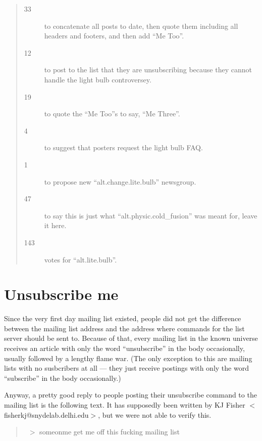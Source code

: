 \documentclass[a4paper]{report}
\begin{document}
\begin{appendix}
\begin{quotation}
\begin{description}
\item[33] to concatenate all posts to date, then quote them including
all headers and footers, and then add ``Me Too''.

\item[12] to post to the list that they are unsubscribing because they
cannot handle the light bulb controversey.

\item[19] to quote the ``Me Too''s to say, ``Me Three''.

\item[4] to suggest that posters request the light bulb FAQ.

\item[1] to propose new ``alt.change.lite.bulb'' newsgroup.

\item[47] to say this is just what ``alt.physic.cold\_fusion'' was
meant for, leave it here.

\item[143] votes for ``alt.lite.bulb''.

\end{description}

\end{quotation}

\section{Unsubscribe me}

Since the very first day mailing list existed, people did not get the
difference between the mailing list address and the address where
commands for the list server should be sent to. Because of that, every
mailing list in the known universe receives an article with only the
word ``unsubscribe'' in the body occasionally, usually followed by a
lengthy flame war. (The only exception to this are mailing lists with
no susbcribers at all --- they just receive postings with only the
word ``subscribe'' in the body occasionally.)

Anyway, a pretty good reply to people posting their unsubscribe
command to the mailing list is the following text. It has supposedly
been written by KJ Fisher $<$fisherkj@snydelab.delhi.edu$>$, but we
were not able to verify this.

\bigskip

\begin{quotation}
\ $>$ someonme get me off this fucking mailing list

\medskip


\end{quotation}
\end{appendix}
\end{document}
